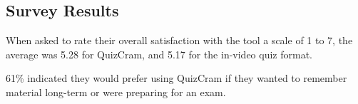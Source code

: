 \documentclass{chi-ext}
\begin{document}


\subsection{Survey Results}

When asked to rate their overall satisfaction with the tool a scale of 1 to 7, the average was 5.28 for QuizCram, and 5.17 for the in-video quiz format. 

61\% indicated they would prefer using QuizCram if they wanted to remember material long-term or were preparing for an exam.




\end{document}
